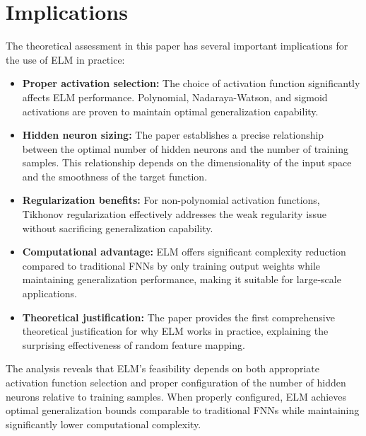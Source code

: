 \documentclass[11pt]{article}
\begin{document}
\section{Implications}

The theoretical assessment in this paper has several important implications for the use of ELM in practice:

\begin{itemize}
    \item \textbf{Proper activation selection:} The choice of activation function significantly affects ELM performance. Polynomial, Nadaraya-Watson, and sigmoid activations are proven to maintain optimal generalization capability.
    
    \item \textbf{Hidden neuron sizing:} The paper establishes a precise relationship between the optimal number of hidden neurons and the number of training samples. This relationship depends on the dimensionality of the input space and the smoothness of the target function.
    
    \item \textbf{Regularization benefits:} For non-polynomial activation functions, Tikhonov regularization effectively addresses the weak regularity issue without sacrificing generalization capability.
    
    \item \textbf{Computational advantage:} ELM offers significant complexity reduction compared to traditional FNNs by only training output weights while maintaining generalization performance, making it suitable for large-scale applications.
    
    \item \textbf{Theoretical justification:} The paper provides the first comprehensive theoretical justification for why ELM works in practice, explaining the surprising effectiveness of random feature mapping.
\end{itemize}

The analysis reveals that ELM's feasibility depends on both appropriate activation function selection and proper configuration of the number of hidden neurons relative to training samples. When properly configured, ELM achieves optimal generalization bounds comparable to traditional FNNs while maintaining significantly lower computational complexity.
\end{document}
